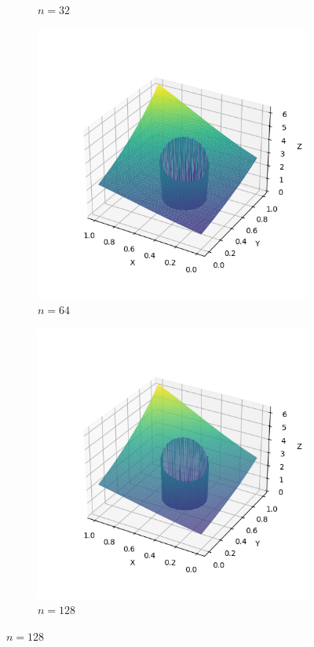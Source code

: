\documentclass[lang=cn,a4paper,newtx,bibend=bibtex]{elegantpaper}
\begin{document}
\begin{figure}[H]
\begin{subfigure}[b]{0.18\textwidth}
      \caption{$n = 32$}
  \end{subfigure}
  \hfill
  \begin{subfigure}[b]{0.18\textwidth}
      \includegraphics[width=\textwidth]{../../res_bac/res-[data|1-mixed-irregular-d64].png}
      \caption{$n = 64$}
  \end{subfigure}
  \hfill
  \begin{subfigure}[b]{0.18\textwidth}
      \includegraphics[width=\textwidth]{../../res_bac/res-[data|1-mixed-irregular-e128].png}
      \caption{$n = 128$}
  \end{subfigure}
\end{figure}
\end{document}
